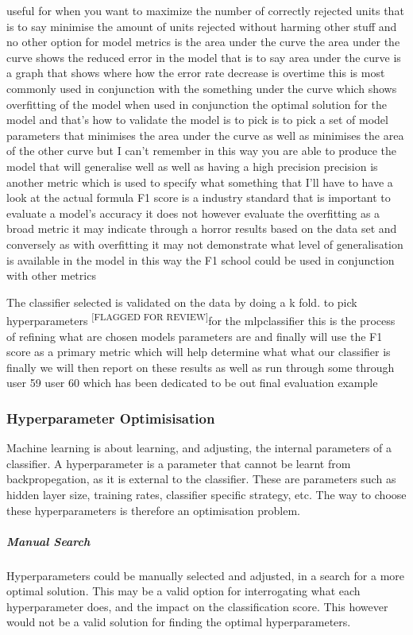 \documentclass{UoNMCHA}
\newcommand{\flagforreview}{\textsuperscript{\color{red} [FLAGGED FOR REVIEW]}}
\numberwithin{equation}{section}
\begin{document}
useful for when you want to maximize the number of correctly rejected units that is to say minimise the amount of units rejected without harming other stuff and no other option for model metrics is the area under the curve the area under the curve shows the reduced error in the model that is to say area under the curve is a graph that shows where how the error rate decrease is overtime this is most commonly used in conjunction with the something under the curve which shows overfitting of the model when used in conjunction the optimal solution for the model and that's how to validate the model is to pick is to pick a set of model parameters that minimises the area under the curve as well as minimises the area of the other curve but I can't remember in this way you are able to produce the model that will generalise well as well as having a high precision precision is another metric which is used to specify what something that I'll have to have a look at the actual formula F1 score is a industry standard that is important to evaluate a model's accuracy it does not however evaluate the overfitting as a broad metric it may indicate through a horror results based on the data set and conversely as with overfitting it may not demonstrate what level of generalisation is available in the model in this way the F1 school could be used in conjunction with other metrics


The classifier selected is validated on the data by doing a k fold. to pick hyperparameters\flagforreview for the mlpclassifier this is the process of refining what are chosen models parameters are and finally will use the F1 score as a primary metric which will help determine what what our classifier is finally we will then report on these results as well as run through some through user 59 user 60 which has been dedicated to be out final evaluation example

\subsubsection{Hyperparameter Optimisisation}
 Machine learning is about learning, and adjusting, the internal parameters of a classifier. A hyperparameter is a parameter that cannot be learnt from backpropegation, as it is external to the classifier. These are parameters such as hidden layer size, training rates, classifier specific strategy, etc. The way to choose these hyperparameters is therefore an optimisation problem.

 \subparagraph{Manual Search}
 Hyperparameters could be manually selected and adjusted, in a search for a more optimal solution. This may be a valid option for interrogating what each hyperparameter does, and the impact on the classification score. This however would not be a valid solution for finding the optimal hyperparameters. \\
\end{document}
